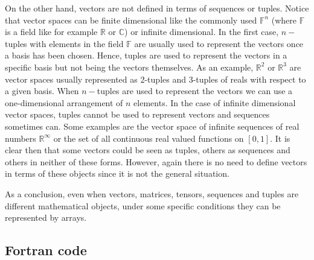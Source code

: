 On the other hand, vectors are not defined in terms of sequences or tuples.
Notice that vector spaces can be finite dimensional like the commonly used $\mathbb{F}^{n}$ 
(where $\mathbb{F}$ is a field like for example $\mathbb{R}$ or $\mathbb{C}$) or infinite dimensional.
In the first case, $n-$tuples with elements in the field $\mathbb{F}$ are usually used to represent the vectors once a basis has been chosen. 
Hence, tuples are used to represent the vectors in a specific basis but not being the vectors themselves.
As an example, $\mathbb{R}^{2}$ or $\mathbb{R}^{3}$ are vector spaces 
usually represented as 2-tuples and 3-tuples of reals with respect to a given basis.
When $n-$tuples are used to represent the vectors we can use a one-dimensional arrangement of $n$ elements.
In the case of infinite dimensional vector spaces, tuples cannot be used to represent vectors and sequences sometimes can. 
Some examples are the vector space of infinite sequences of real numbers $\mathbb{R}^\infty$ or 
the set of all continuous real valued functions on $[0,1]$.
It is clear then that some vectors could be seen as tuples, others as sequences and others in neither of these forms. 
However, again there is no need to define 
vectors in terms of these objects since it is not the general situation. 

As a conclusion, even when vectors, matrices, tensors, sequences and tuples are different mathematical objects, 
under some specific conditions they can be represented by arrays.















        \newpage
        \subsection*{Fortran code}
        
